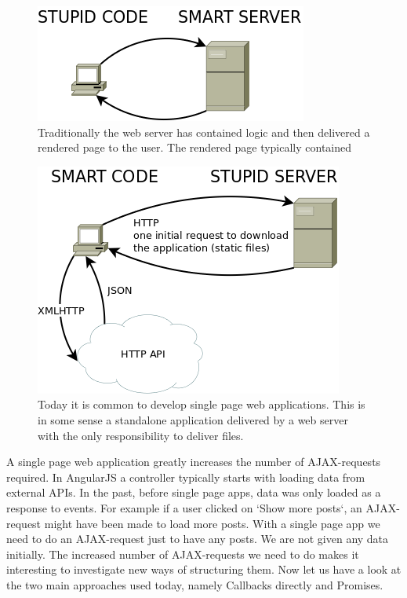 \documentclass[a4paper,12pt]{article}
\begin{document}
\begin{figure}[!htbp]
  \includegraphics[scale=0.5]{traditional_cs_model.png}
  \caption{
    Traditionally the web server has contained logic and then delivered a rendered page to the user.
    The rendered page typically contained 
  }
\end{figure}

\begin{figure}[!htbp]
  \includegraphics[scale=0.5]{new_cs_model.png}
  \caption{
    Today it is common to develop single page web applications. 
    This is in some sense a standalone application delivered by a web server with the only responsibility to deliver files.
  }
\end{figure}

A single page web application greatly increases the number of AJAX-requests required. In AngularJS a controller typically
starts with loading data from external APIs. In the past, before single page apps, data was only loaded as a response to events.
For example if a user clicked on `Show more posts`, an AJAX-request might have been made to load more posts.
With a single page app we need to do an AJAX-request just to have any posts. We are not given any data initially.
The increased number of AJAX-requests we need to do makes it interesting to investigate new ways of structuring them.
Now let us have a look at the two main approaches used today, namely Callbacks directly and Promises.
\end{document}
